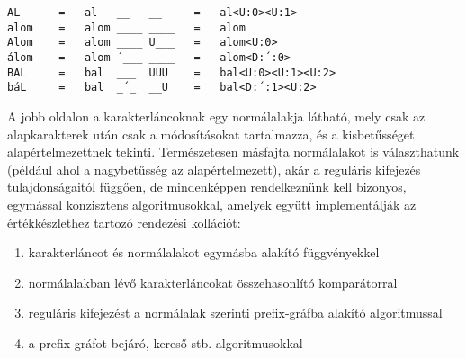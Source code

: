 \documentclass[
    parspace,
    noindent,
    nohyp,
]{elteiktdk}[2023/04/10]
\begin{document}
\begin{verbatim}
AL      =   al   __   __     =   al<U:0><U:1>
alom    =   alom ____ ____   =   alom
Alom    =   alom ____ U___   =   alom<U:0>
álom    =   alom ´___ ____   =   alom<D:´:0>
BAL     =   bal  ___  UUU    =   bal<U:0><U:1><U:2>
báL     =   bal  _´_  __U    =   bal<D:´:1><U:2>
\end{verbatim}

A jobb oldalon a karakterláncoknak egy normálalakja látható,
mely csak az alapkarakterek után csak a módosításokat tartalmazza,
és a kisbetűsséget alapértelmezettnek tekinti.
Természetesen másfajta normálalakot is választhatunk (például ahol a nagybetűsség az alapértelmezett),
akár a reguláris kifejezés tulajdonságaitól függően,
de mindenképpen rendelkeznünk kell bizonyos, egymással konzisztens algoritmusokkal,
amelyek együtt implementálják az értékkészlethez tartozó rendezési kollációt:

\begin{enumerate}
    \item karakterláncot és normálalakot egymásba alakító függvényekkel
    \item normálalakban lévő karakterláncokat összehasonlító komparátorral
    \item reguláris kifejezést a normálalak szerinti prefix-gráfba alakító algoritmussal
    \item a prefix-gráfot bejáró, kereső stb. algoritmusokkal
\end{enumerate}


\end{document}
